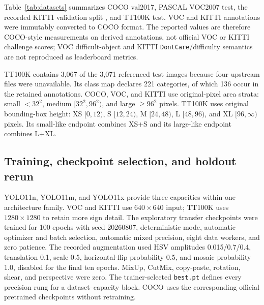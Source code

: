 Table~\ref{tab:datasets} summarizes COCO val2017\citep{lin2014coco}, PASCAL
VOC2007 test\citep{everingham2015voc}, the recorded KITTI validation split
\citep{geiger2012kitti}, and TT100K test\citep{zhu2016tt100k}. VOC and KITTI
annotations were immutably converted to COCO format. The reported values are
therefore COCO-style measurements on derived annotations, not official VOC or
KITTI challenge scores; VOC difficult-object and KITTI
\texttt{DontCare}/difficulty semantics are not reproduced as leaderboard
metrics.

TT100K contains 3,067 of the 3,071 referenced test images because four upstream
files were unavailable. Its class map declares 221 categories, of which 136
occur in the retained annotations. COCO, VOC, and KITTI use original-pixel area
strata: small $<32^2$, medium $[32^2,96^2)$, and large $\geq96^2$ pixels.
TT100K uses original bounding-box height: XS $[0,12)$, S $[12,24)$, M
$[24,48)$, L $[48,96)$, and XL $[96,\infty)$ pixels. Its small-like endpoint
combines XS+S and its large-like endpoint combines L+XL.

\begin{table}[t]
\centering
\caption{Frozen evaluation datasets. Counts refer to the converted annotations
consumed by the evaluator.}
\label{tab:datasets}
\resizebox{\textwidth}{!}{}
\end{table}

\subsection{Training, checkpoint selection, and holdout rerun}
\label{sec:training}

YOLO11n, YOLO11m, and YOLO11x provide three capacities within one architecture
family\citep{jocher2024yolo11}. VOC and KITTI use $640\times640$ input; TT100K
uses $1280\times1280$ to retain more sign detail. The exploratory transfer
checkpoints were trained for 100 epochs with seed 20260807, deterministic mode,
automatic optimizer and batch selection, automatic mixed precision, eight data
workers, and zero patience. The recorded augmentation used HSV amplitudes
0.015/0.7/0.4, translation 0.1, scale 0.5, horizontal-flip probability 0.5,
and mosaic probability 1.0, disabled for the final ten epochs. MixUp, CutMix,
copy-paste, rotation, shear, and perspective were zero. The trainer-selected
\texttt{best.pt} defines every precision rung for a dataset--capacity block.
COCO uses the corresponding official pretrained checkpoints without retraining.

